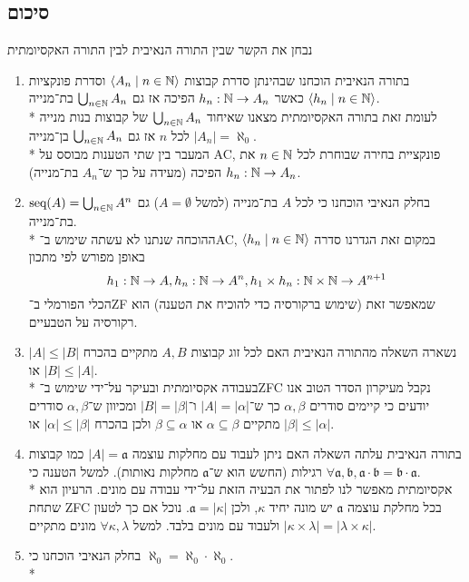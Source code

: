 \subsection{סיכום}
נבחן את הקשר שבין התורה הנאיבית לבין התורה האקסיומתית
\begin{enumerate}
	\item בתורה הנאיבית הוכחנו שבהינתן סדרת קבוצות $\langle A_n \mid n \in \mathbb{N} \rangle$ וסדרת פונקציות $\langle h_n \mid n \in \mathbb{N} \rangle$ כאשר $h_n : \mathbb{N} \to A_n$ הפיכה אז גם $\bigcup_{n \in \mathbb{N}} A_n$ בת־מנייה. \\*
		לעומת זאת בתורה האקסיומתית מצאנו שאיחוד $\bigcup_{n \in \mathbb{N}} A_n$ של קבוצות בנות מנייה $|A_n| = \aleph_0$ לכל $n$ אז גם $\bigcup_{n \in \mathbb{N}} A_n$ בן־מנייה. \\*
		המעבר בין שתי הטענות מבוסס על AC, פונקציית בחירה שבוחרת לכל $n \in \mathbb{N}$ את $h_n : \mathbb{N} \to A_n$ הפיכה (מעידה על כך ש־$A_n$ בת־מנייה).
	\item בחלק הנאיבי הוכחנו כי לכל $A$ בת־מנייה (למשל $A = \emptyset$) גם $\text{seq}(A) = \bigcup_{n \in \mathbb{N}} A^n$ בת־מנייה. \\*
		ההוכחה שנתנו לא עשתה שימוש ב־AC, במקום זאת הגדרנו סדרה $\langle h_n \mid n \in \mathbb{N} \rangle$ באופן מפורש לפי מתכון
		\[
			h_1 : \mathbb{N} \to A,
			h_n : \mathbb{N} \to A^n,
			h_1 \times h_n : \mathbb{N} \times \mathbb{N} \to A^{n + 1}
		\]
		הכלי הפורמלי ב־ZF שמאפשר זאת (שימוש ברקורסיה כדי להוכיח את הטענה) הוא רקורסיה על הטבעיים.
	\item נשארה השאלה מהתורה הנאיבית האם לכל זוג קבוצות $A, B$ מתקיים בהכרח $|A| \le |B|$ או $|B| \le |A|$. \\*
		בעבודה אקסיומתית ובעיקר על־ידי שימוש ב־ZFC נקבל מעיקרון הסדר הטוב אנו יודעים כי קיימים סודרים $\alpha, \beta$
		כך ש־$|A| = |\alpha|$ ו־$|B| = |\beta|$ ומכיוון ש־$\alpha, \beta$ סודרים מתקיים $\alpha \subseteq \beta$ או $\beta \subseteq \alpha$ ולכן בהכרח $|\alpha| \le |\beta|$ או $|\beta| \le |\alpha|$.
	\item בתורה הנאיבית עלתה השאלה האם ניתן לעבוד עם מחלקות עוצמה $|A| = \mathfrak{a}$ כמו קבוצות רגילות (החשש הוא ש־$\mathfrak{a}$ מחלקות נאותות).
		למשל הטענה כי $\forall \mathfrak{a}, \mathfrak{b}, \mathfrak{a} \cdot \mathfrak{b} = \mathfrak{b} \cdot \mathfrak{a}$. \\*
		אקסיומתית מאפשר לנו לפתור את הבעיה הזאת על־ידי עבודה עם מונים.
		הרעיון הוא שתחת ZFC בכל מחלקת עוצמה $\mathfrak{a}$ יש מונה יחיד $\kappa$, ולכן $\mathfrak{a} = |\kappa|$.
		נוכל אם כך לטעון ולעבוד עם מונים בלבד.
		למשל $\forall \kappa, \lambda$ מונים מתקיים $|\kappa \times \lambda| = |\lambda \times \kappa|$.
	\item בחלק הנאיבי הוכחנו כי $\aleph_0 = \aleph_0 \cdot \aleph_0$. \\*

\end{enumerate}
